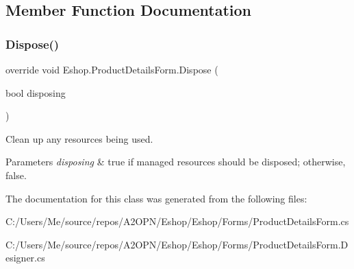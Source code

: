 \subsection{Member Function Documentation}
\mbox{\label{class_eshop_1_1_product_details_form_abf50712acc78a5094ac44d57ba33c3b3}} 
\subsubsection{\texorpdfstring{Dispose()}{Dispose()}}
{\footnotesize\ttfamily override void Eshop.\+Product\+Details\+Form.\+Dispose (\begin{DoxyParamCaption}\item[{bool}]{disposing }\end{DoxyParamCaption})\hspace{0.3cm}{\ttfamily [protected]}}



Clean up any resources being used. 


\begin{DoxyParams}{Parameters}
{\em disposing} & true if managed resources should be disposed; otherwise, false.\\
\hline
\end{DoxyParams}


The documentation for this class was generated from the following files\+:\begin{DoxyCompactItemize}
\item 
C\+:/\+Users/\+Me/source/repos/\+A2\+O\+P\+N/\+Eshop/\+Eshop/\+Forms/Product\+Details\+Form.\+cs\item 
C\+:/\+Users/\+Me/source/repos/\+A2\+O\+P\+N/\+Eshop/\+Eshop/\+Forms/Product\+Details\+Form.\+Designer.\+cs\end{DoxyCompactItemize}
